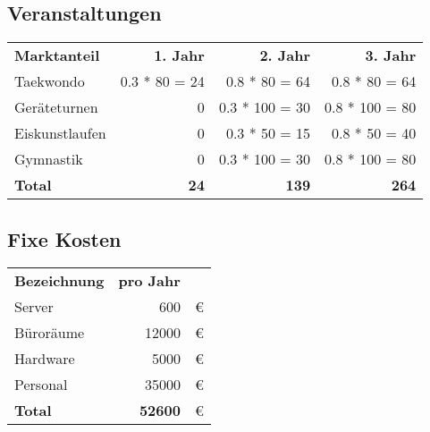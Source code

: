 \subsection{Veranstaltungen}

\begin{table}[H]

    \begin{tabular}{l r r r}
        \textbf{Marktanteil}	& \textbf{1. Jahr}  & \textbf{2. Jahr}  & \textbf{3. Jahr} \\
        Taekwondo               & 0.3 * 80 = 24     & 0.8 *  80 = 64    & 0.8 *  80 = 64\\
        Geräteturnen            & 0                 & 0.3 * 100 = 30    & 0.8 * 100 = 80\\
        Eiskunstlaufen          & 0                 & 0.3 *  50 = 15    & 0.8 *  50 = 40\\
        Gymnastik               & 0                 & 0.3 * 100 = 30    & 0.8 * 100 = 80\\
        \midrule
        \textbf{Total}          & \textbf{24}   & \textbf{139}      & \textbf{264}
    \end{tabular}
    \label{tab:veranstaltungen}
\end{table}

\subsection{Fixe Kosten}

\begin{table}[H]

    \begin{tabular}{l r l}
        \textbf{Bezeichnung}    & \textbf{pro Jahr} & \\
        Server                  & 600               & €\\
        Büroräume               & 12000             & €\\
        Hardware                & 5000              & €\\
        Personal                & 35000             & €\\
        \midrule
        \textbf{Total}          & \textbf{52600}    & €\\
    \end{tabular}
    \label{tab:Fixkosten}
\end{table}

